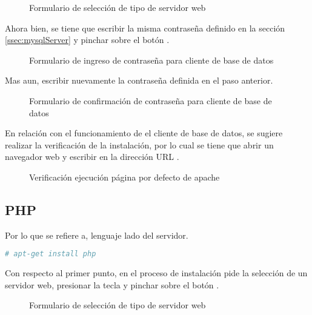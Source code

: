 \begin{figure}[!ht]
\centering
		\caption{Formulario de selección de tipo de servidor web}
\end{figure}

Ahora bien, se tiene que escribir la misma contraseña definido en la sección
\ref{ssec:mysqlServer} y pinchar sobre el botón .

\begin{figure}[H]
\centering
		\caption{Formulario de ingreso de contraseña para cliente de base de datos}
\end{figure}

Mas aun, escribir nuevamente la contraseña definida en el paso anterior.

\begin{figure}[!ht]
\centering
		\caption{Formulario de confirmación de contraseña para cliente de base de datos}
\end{figure}

En relación con el funcionamiento de el cliente de base de datos, se sugiere
realizar la verificación de la instalación, por lo cual se tiene que abrir un
navegador web y escribir en la dirección URL 
.

\begin{figure}[!ht]
\centering
		\caption{Verificación ejecución página por defecto de apache}
\end{figure}

\subsection{PHP}

Por lo que se refiere a, lenguaje lado del servidor.

\begin{lstlisting}[language=bash, caption={Comando para instalación de lenguaje en el lado del servidor}]
# apt-get install php 
\end{lstlisting}

Con respecto al primer punto, en el proceso de instalación pide la selección
de un servidor web, presionar la tecla  y pinchar sobre
el botón .

\begin{figure}[!ht]
\centering
		\caption{Formulario de selección de tipo de servidor web}
\end{figure}

